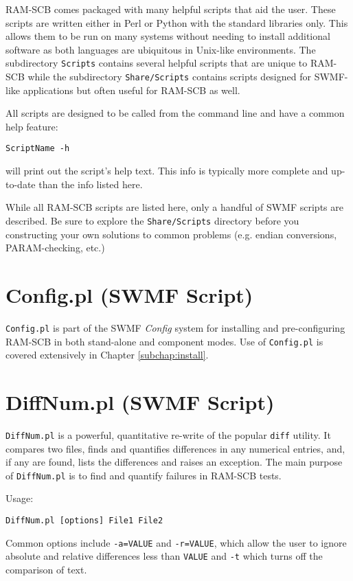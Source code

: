 RAM-SCB comes packaged with many helpful scripts that aid the user.  These scripts are written either in Perl or Python with the standard libraries only. This allows them to be run on many systems without needing to install additional software as both languages are ubiquitous in Unix-like environments. The subdirectory {\tt Scripts} contains several helpful scripts that are unique to RAM-SCB while the subdirectory {\tt Share/Scripts} contains scripts designed for SWMF-like applications but often useful for RAM-SCB as well.

All scripts are designed to be called from the command line and have a common help feature:
\begin{verbatim}
ScriptName -h
\end{verbatim}
\noindent will print out the script's help text.  This info is typically more complete and up-to-date than the info listed here.

While all RAM-SCB scripts are listed here, only a handful of SWMF scripts are described. Be sure to explore the {\tt Share/Scripts} directory before you constructing your own solutions to common problems (e.g. endian conversions, PARAM-checking, etc.) 

\section{Config.pl (SWMF Script)}
{\tt Config.pl} is part of the SWMF \textit{Config} system for installing and pre-configuring RAM-SCB in both stand-alone and component modes. Use of {\tt Config.pl} is covered extensively in Chapter \ref{subchap:install}.

\section{DiffNum.pl (SWMF Script)}
{\tt DiffNum.pl} is a powerful, quantitative re-write of the popular {\tt diff} utility.  It compares two files, finds and quantifies differences in any numerical entries, and, if any are found, lists the differences and raises an exception.  The main purpose of {\tt DiffNum.pl} is to find and quantify failures in RAM-SCB tests.

Usage:
\begin{verbatim}
DiffNum.pl [options] File1 File2
\end{verbatim}

Common options include {\tt -a=VALUE} and {\tt -r=VALUE}, which allow the user to ignore absolute and relative differences less than {\tt VALUE} and {\tt -t} which turns off the comparison of text.


